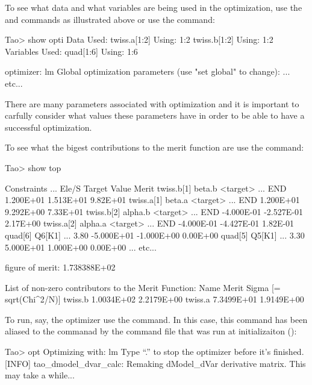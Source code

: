 \documentclass{hitec}
\begin{document}
{\begin{code}
\begin{code}
To see what data and what variables are being used in the optimization, use the  and
 commands as illustrated above or use the  command:
\begin{code}
Tao> show opti
Data Used:
  twiss.a[1:2]                                   Using: 1:2
  twiss.b[1:2]                                   Using: 1:2
Variables Used:
  quad[1:6]                                      Using: 1:6

optimizer:        lm
Global optimization parameters (use "set global" to change):
... etc...
\end{code}
There are many parameters associated with optimization and it is important to carfully consider
what values these parameters have in order to be able to have a successful optimization.

To see what the bigest contributions to the merit function
are use the  command:
\begin{code}
Tao> show top

Constraints                   ...   Ele/S     Target      Value      Merit  
twiss.b[1]  beta.b <target>   ...   END       1.200E+01   1.513E+01  9.82E+01
twiss.a[1]  beta.a <target>   ...   END       1.200E+01   9.292E+00  7.33E+01
twiss.b[2]  alpha.b <target>  ...   END      -4.000E-01  -2.527E-01  2.17E+00
twiss.a[2]  alpha.a <target>  ...   END      -4.000E-01  -4.427E-01  1.82E-01
quad[6]     Q6[K1]            ...   3.80     -5.000E+01  -1.000E+00  0.00E+00
quad[5]     Q5[K1]            ...   3.30      5.000E+01   1.000E+00  0.00E+00
... etc...

 figure of merit: 1.738388E+02

List of non-zero contributors to the Merit Function:
Name                           Merit           Sigma [= sqrt(Chi^2/N)]
twiss.b                        1.0034E+02      2.2179E+00
twiss.a                        7.3499E+01      1.9149E+00
\end{code}

To run, say, the  optimizer use the  command. In this case, this command
has been aliased to the  commanad by the  command file that was run
at initializaiton ():
\begin{code}
Tao> opt
Optimizing with: lm
Type ``.'' to stop the optimizer before it's finished.
[INFO] tao_dmodel_dvar_calc:
    Remaking dModel_dVar derivative matrix.
    This may take a while...


\end{code}
\end{code}
\end{code}}
\end{document}
